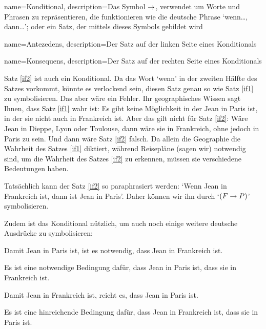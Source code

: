 {
name=Konditional,
description={Das Symbol $\rightarrow$, verwendet um Worte und Phrasen zu repräsentieren, die funktionieren wie die deutsche Phrase `wenn\dots, dann\dots'; oder ein Satz, der mittels dieses Symbols gebildet wird}
}

{
name=Antezedens,
description={Der Satz auf der linken Seite eines \gls{Konditional}s}
}


{
name=Konsequens,
description={Der Satz auf der rechten Seite eines \gls{Konditional}s}
}

Satz \ref{if2} ist auch ein Konditional. Da das Wort `wenn' in der zweiten Hälfte des Satzes vorkommt, könnte es verlockend sein, diesen Satz genau so wie Satz \ref{if1} zu symbolisieren. Das aber wäre ein Fehler. Ihr geographisches Wissen sagt Ihnen, dass Satz \ref{if1} wahr ist: Es gibt keine Möglichkeit in der Jean in Paris ist, in der sie nicht auch in Frankreich ist. Aber das gilt nicht für Satz \ref{if2}: Wäre Jean in Dieppe, Lyon oder Toulouse, dann wäre sie in Frankreich, ohne jedoch in Paris zu sein. Und dann wäre Satz \ref{if2} falsch. Da allein die Geographie die Wahrheit des Satzes \ref{if1} diktiert, während Reisepläne (sagen wir) notwendig sind, um die Wahrheit des Satzes \ref{if2} zu erkennen, müssen sie verschiedene Bedeutungen haben.

Tatsächlich kann der Satz \ref{if2} so paraphrasiert werden: `Wenn Jean in Frankreich ist, dann ist Jean in Paris'. Daher können wir ihn durch `$(F \rightarrow P)$' symbolisieren.

Zudem ist das Konditional nützlich, um auch noch einige weitere deutsche Ausdrücke zu symbolisieren: 
\begin{earg}
		\item[\ex{ifnec1}] Damit Jean in Paris ist, ist es notwendig, dass Jean in Frankreich ist.
		\item[\ex{ifnec2}] Es ist eine notwendige Bedingung dafür, dass Jean in Paris ist, dass sie in Frankreich ist.
		\item[\ex{ifsuf1}] Damit Jean in Frankreich ist, reicht es, dass Jean in Paris ist.
		\item[\ex{ifsuf2}] Es ist eine hinreichende Bedingung dafür, dass Jean in Frankreich ist, dass sie in Paris ist.
\end{earg}

